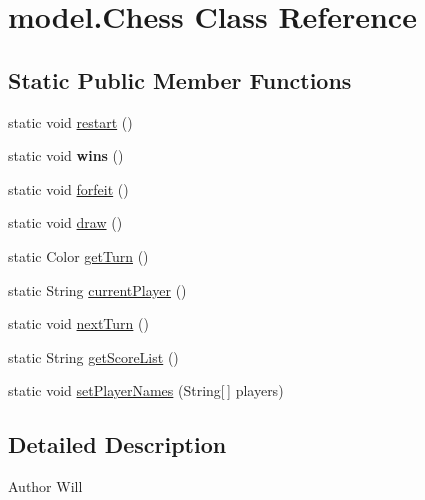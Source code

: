 \hypertarget{classmodel_1_1_chess}{\section{model.\-Chess Class Reference}
\label{classmodel_1_1_chess}
}
\subsection*{Static Public Member Functions}
\begin{DoxyCompactItemize}
\item 
static void \hyperlink{classmodel_1_1_chess_aee53a6846e5dbe60cfd0b62cbe373788}{restart} ()
\item 
\hypertarget{classmodel_1_1_chess_ab7d140bf0b52b8397858de46fdf2a0ce}{static void {\bfseries wins} ()}\label{classmodel_1_1_chess_ab7d140bf0b52b8397858de46fdf2a0ce}

\item 
static void \hyperlink{classmodel_1_1_chess_af399b48ddd8715c973c47e495d4b3c25}{forfeit} ()
\item 
static void \hyperlink{classmodel_1_1_chess_a07b47f12039f14faa2328596cd0f06f6}{draw} ()
\item 
static Color \hyperlink{classmodel_1_1_chess_a6cd0aad82f26cb7db49848d977cd4b56}{get\-Turn} ()
\item 
static String \hyperlink{classmodel_1_1_chess_abd2d0e384c5be0d5195c05cc691364e1}{current\-Player} ()
\item 
static void \hyperlink{classmodel_1_1_chess_ab0062f08be39cde173dde158d1faacbe}{next\-Turn} ()
\item 
static String \hyperlink{classmodel_1_1_chess_a88168b5d5a7fd11c21d1132110da6e70}{get\-Score\-List} ()
\item 
static void \hyperlink{classmodel_1_1_chess_a060f443a73a9090f8160ea803e56f786}{set\-Player\-Names} (String\mbox{[}$\,$\mbox{]} players)
\end{DoxyCompactItemize}


\subsection{Detailed Description}
\begin{DoxyAuthor}{Author}
Will 
\end{DoxyAuthor}


